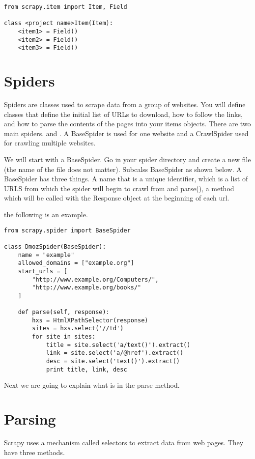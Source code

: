 \begin{lstlisting}
from scrapy.item import Item, Field

class <project name>Item(Item):
    <item1> = Field()
    <item2> = Field()
    <item3> = Field()
\end{lstlisting}

\section*{Spiders}
Spiders are classes used to scrape data from a group of websites. You will define classes that define the initial list of URLs to download, how to follow the links, and how to parse the contents of the pages into your items objects. There are two main spiders.  and . A BaseSpider is used for one website and a CrawlSpider used for crawling multiple websites.

We will start with a BaseSpider. Go in your spider directory and create a new file (the name of the file does not matter). Subcalss BaseSpider as shown below. A BaseSpider has three things. A name that is a unique identifier,  which is a list of URLS from which the spider will begin to crawl from and parse(), a method which will be called with the Response object at the beginning of each url.

the following is an example.
\begin{lstlisting}
from scrapy.spider import BaseSpider

class DmozSpider(BaseSpider):
    name = "example"
    allowed_domains = ["example.org"]
    start_urls = [
        "http://www.example.org/Computers/",
        "http://www.example.org/books/"
    ]

    def parse(self, response):
        hxs = HtmlXPathSelector(response)
        sites = hxs.select('//td')
        for site in sites:
            title = site.select('a/text()').extract()
            link = site.select('a/@href').extract()
            desc = site.select('text()').extract()
            print title, link, desc
\end{lstlisting}

Next we are going to explain what is in the parse method.

\section*{Parsing}
Scrapy uses a mechanism called selectors to extract data from web pages.
They have three methods.

